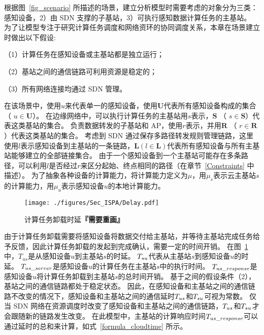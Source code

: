 根据图~\ref{fig_scenario} 所描述的场景，建立分析模型时需要考虑的对象分为三类：
感知设备，2）由 SDN 支撑的子基站，3）可执行感知数据计算任务的主基站。
为了让模型专注于研究计算任务调度和网络资环的协同调度关系，本章在场景建立时做出以下假设: 

（1）计算任务在感知设备或主基站都是独立运行；

（2）基站之间的通信链路可利用资源是稳定的；

（3）所有网络连接均通过 SDN 管理。



在该场景中，使用$u$来代表单一的感知设备，使用$\boldsymbol{U}$代表所有感知设备构成的集合（ $ u \in \boldsymbol{U} $）。
在边缘网络中，可以执行计算任务的主基站用$s$表示，$\boldsymbol{S}$ （ $ s \in \boldsymbol{S} $）代表这类基站的集合。
负责数据转发的子基站和 AP，使用$r$表示，并用$\boldsymbol{R}$ （ $ r \in \boldsymbol{R} $）代表这类基站的集合。
考虑到 SDN 通过保存多路径转发规则管理链路，这里使用$l$表示感知设备到主基站的一条链路，$ \boldsymbol{L} ( l \in \boldsymbol{L} ) $代表所有感知设备与所有主基站能够建立的全部链接集合。
由于一个感知设备到一个主基站可能存在多条路径，可以利用$l$是否经过$r$来区分起始、终点相同的路径（在章节~\ref{Constraints} 中描述）。
为了抽象各种设备的计算能力，将计算能力定义为$\mu$，用$\mu_s$表示云主基站$s$的计算能力，用$\mu_u$表示感知设备$u$的本地计算能力。

\begin{figure}[!h]
  \centering
  \vspace{-1em}
  \texttt{[image: ./figures/Sec\_ISPA/Delay.pdf]}
  \vspace{-1em}
  \caption{计算任务卸载时延\textbf{『需要重画』}}
  \vspace{-1em}
  \label{fig_timestaps}
\end{figure}

由于计算任务卸载需要将感知设备将数据交付给主基站，并等待主基站完成任务给予反馈，因此计算任务卸载的发起到完成确认，需要一定的时间开销。
在图~\ref{fig_timestaps} 中，${T}_{us}$是从感知设备$u$到主基站$s$的时延。
${T}_{su}$代表从主基站$s$到感知设备$u$的时延。
${T}_{us\_server}$是感知设备$u$的计算任务在主基站$s$中的执行时间。
${T}_{us\_response}$是感知设备$u$将计算任务卸载到主基站$s$的总时间开销。
基于之间的假设条件（2），基站之间的通信链路都处于稳定状态。
因此，在感知设备和主基站之间的通信链路不改变的情况下，感知设备和主基站之间的通信延时${T}_{us}$和${T}_{su}$可视为常数。
仅当 SDN 网络在资源调度时改变了感知设备和主基站之间的通信链路，${T}_{us}$和${T}_{su}$才会跟随新的链路发生改变。
在此模型中，主基站的计算响应时间${T}_{us\_response}$可以通过延时的总和来计算，如式~\eqref{formula_cloudtime} 所示。

